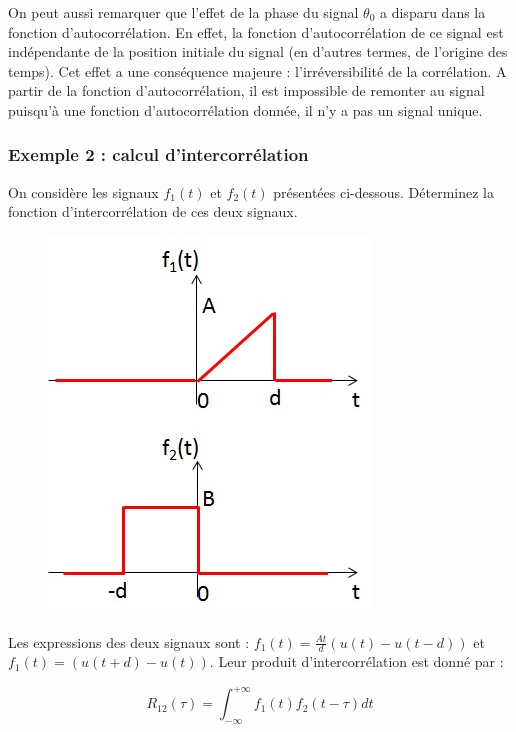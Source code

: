 	On peut aussi remarquer que l'effet de la phase du signal $\theta_{0}$ a disparu dans la fonction d'autocorrélation. En effet, la fonction d'autocorrélation de ce signal est indépendante de la position initiale du signal (en d'autres termes, de l'origine des temps). Cet effet a une conséquence majeure : l'irréversibilité de la corrélation. A partir de la fonction d'autocorrélation, il est impossible de remonter au signal puisqu'à une fonction d'autocorrélation donnée, il n'y a pas un signal unique.
	
	\vspace{0.5\baselineskip}
		
	
	\subsubsection{Exemple 2 : calcul d'intercorrélation}
	
	On considère les signaux $f_{1}(t)$ et $f_{2}(t)$ présentées ci-dessous. Déterminez la fonction d'intercorrélation de ces deux signaux.
	
	\begin{figure}[h!]
		\centering
		\includegraphics[scale=0.6]{images/Ex_intercorrelation.jpg}
	\end{figure}
	
	Les expressions des deux signaux sont : $f_{1}(t)=\frac{At}{d}(u(t)-u(t-d))$ et $f_{1}(t)=(u(t+d)-u(t))$. Leur produit d'intercorrélation est donné par :
	
	\begin{equation*}
	R_{12}(\tau)=\int_{-\infty}^{+\infty}f_{1}(t)f_{2}(t-\tau)dt
	\end{equation*}
	
